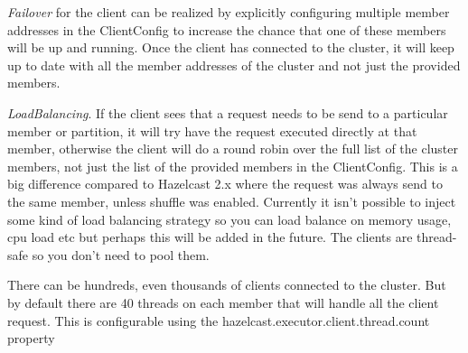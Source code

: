 \emph{Failover} for the client can be realized by explicitly configuring multiple member addresses in the ClientConfig to increase the chance that one of these members will be up and running. Once the client has connected to the cluster, it will keep up to date with all the member addresses of the cluster and not just the provided members.

\emph{LoadBalancing}. If the client sees that a request needs to be send to a particular member or partition, it will try have the request executed directly at that member, otherwise the client will do a round robin over the full list of the cluster members, not just the list of the provided members in the ClientConfig. This is a big difference compared to Hazelcast 2.x where the request was always send to the same member, unless shuffle was enabled. Currently it isn't possible to inject some kind of load balancing strategy so you can load balance on memory usage, cpu load etc but perhaps this will be added in the future. The clients are thread-safe so you don't need to pool them.

There can be hundreds, even thousands of clients connected to the cluster. But by default there are 40 threads on each member that will handle all the client request. This is configurable using the hazelcast.executor.client.thread.count property

